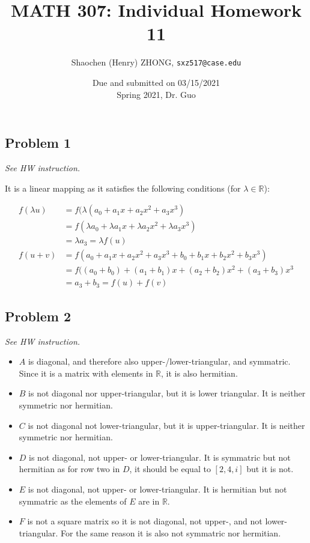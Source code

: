 \documentclass[11pt]{article}
\newcommand{\ilc}{\texttt}
\begin{document}
\title{\textbf{MATH 307: Individual Homework 11}}


\author{Shaochen (Henry) ZHONG, \ilc{sxz517@case.edu}}

\date{Due and submitted on 03/15/2021 \\ Spring 2021, Dr. Guo}
\maketitle



\subsection*{Problem 1}
\textit{See HW instruction.}\newline

It is a linear mapping as it satisfies the following conditions (for $\lambda \in \mathbb{R}$):

\begin{align*}
    f(\lambda u) &= f(\lambda (a_0 + a_1 x + a_2 x^2 + a_3 x^3) \\
    &= f(\lambda a_0 + \lambda a_1 x + \lambda a_2 x^2 + \lambda a_3 x^3) \\
    &= \lambda a_3 = \lambda f(u)\\
    f(u + v) &= f(a_0 + a_1 x + a_2 x^2 + a_3 x^3 + b_0 + b_1 x + b_2 x^2 + b_3 x^3) \\
    &= f( (a_0 + b_0) + (a_1 + b_1) x + (a_2 + b_2) x^2 + (a_3 + b_3) x^3 \\
    &= a_3 + b_3 = f(u) + f(v)
\end{align*}




\subsection*{Problem 2}
\textit{See HW instruction.}\newline

\begin{itemize}
    \item $A$ is diagonal, and therefore also upper-/lower-triangular, and symmatric. Since it is a matrix with elements in $\mathbb{R}$, it is also hermitian.
    \item $B$ is not diagonal nor upper-triangular, but it is lower triangular. It is neither symmetric nor hermitian.
    \item $C$ is not diagonal not lower-triangular, but it is upper-triangular. It is neither symmetric nor hermitian.
    \item $D$ is not diagonal, not upper- or lower-triangular. It is symmatric but not hermitian as for row two in $D$, it should be equal to $[2, 4, i]$ but it is not.
    \item $E$ is not diagonal, not upper- or lower-triangular. It is hermitian but not symmatric as the elements of $E$ are in $\mathbb{R}$.
    \item $F$ is not a square matrix so it is not diagonal, not upper-, and not lower-triangular. For the same reason it is also not symmatric nor hermitian.
\end{itemize}
\end{document}
